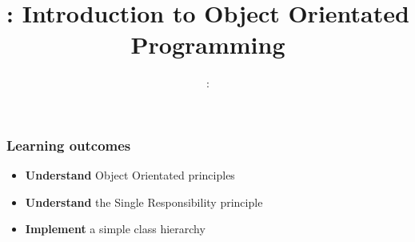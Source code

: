 \usepackage{../../beamerthemeFalmouthGamesAcademy}
\usepackage{multimedia}
\graphicspath{ {../../} }


\usepackage[normalem]{ulem}
\usepackage{wasysym}
\usepackage{pdfpages}

\usetikzlibrary{arrows,automata}




\title{\sessionnumber: Introduction to Object Orientated Programming}
\subtitle{\modulecode: \moduletitle}

\frame{\titlepage} 

\begin{frame}
	\frametitle{Learning outcomes}
	\begin{itemize}
		\item \textbf{Understand} Object Orientated principles
		\item \textbf{Understand} the Single Responsibility principle
		\item \textbf{Implement} a simple class hierarchy
	\end{itemize}
\end{frame}








